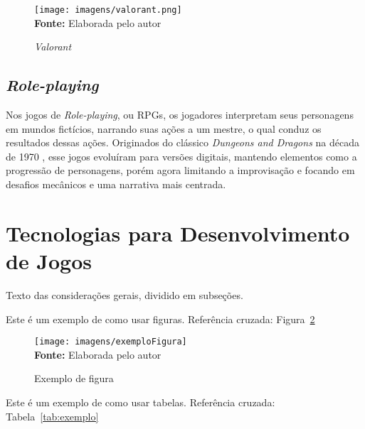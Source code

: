 \FloatBarrier 
\begin{figure}[!htbp]
	\centering
	\caption{\textit{Valorant}}
	\texttt{[image: imagens/valorant.png]}
	\\\textbf{Fonte:} Elaborada pelo autor
	
	\label{fig:vava}
\end{figure}
\FloatBarrier


\subsection{\textit{Role-playing}}

Nos jogos de \textit{Role-playing}, ou RPGs, os jogadores interpretam seus personagens em mundos fictícios, narrando suas ações a um mestre, o qual conduz os resultados dessas ações. Originados do clássico  \textit{Dungeons and Dragons} na década de 1970 \cite{Mason2004}, esse jogos evoluíram para versões digitais, mantendo elementos como a progressão de personagens, porém agora limitando a improvisação e focando em desafios mecânicos e uma narrativa mais centrada.

\section{Tecnologias para Desenvolvimento de Jogos} 









Texto das considerações gerais, dividido em subseções.

Este é um exemplo de como usar figuras. Referência cruzada: Figura~\ref{fig:exemplo}

\FloatBarrier
\begin{figure}[!htbp]
	\centering
	\caption{Exemplo de figura}
	\texttt{[image: imagens/exemploFigura]}
	\\\textbf{Fonte:} Elaborada pelo autor
	\label{fig:exemplo}
\end{figure}
\FloatBarrier


Este é um exemplo de como usar tabelas. Referência cruzada: Tabela~\ref{tab:exemplo}

